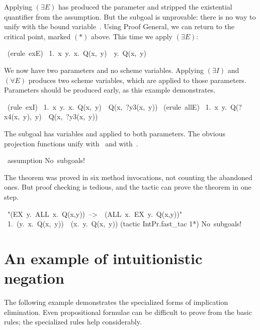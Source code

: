 Applying $(\exists E)$ has produced the parameter  and stripped the
existential quantifier from the assumption.  But the subgoal is unprovable:
there is no way to unify  with the bound variable~.
Using Proof General, we can return to the critical point, marked
$(*)$ above.  This time we apply $({\exists}E)$:
\begin{isabelle}
\ (erule\ exE)\isanewline
\ 1.\ \isasymAnd x\ y.\ \isasymforall x.\ Q(x,\ y)\
\isasymLongrightarrow \ \isasymexists y.\ Q(x,\ y)
\end{isabelle}
We now have two parameters and no scheme variables.  Applying
$({\exists}I)$ and $({\forall}E)$ produces two scheme variables, which are
applied to those parameters.  Parameters should be produced early, as this
example demonstrates.
\begin{isabelle}
\ (rule\ exI)\isanewline
\ 1.\ \isasymAnd x\ y.\ \isasymforall x.\ Q(x,\ y)\
\isasymLongrightarrow \ Q(x,\ ?y3(x,\ y))
\isanewline
{}\ (erule\ allE)\isanewline
\ 1.\ \isasymAnd x\ y.\ Q(?x4(x,\ y),\ y)\ \isasymLongrightarrow \
Q(x,\ ?y3(x,\ y))
\end{isabelle}
The subgoal has variables \isa{?y3} and \isa{?x4} applied to both
parameters.  The obvious projection functions unify  with~\isa{
x} and  with~.
\begin{isabelle}
\isacommand{apply}\ assumption\isanewline
No\ subgoals!\isanewline
\isacommand{done}
\end{isabelle}
The theorem was proved in six method invocations, not counting the
abandoned ones.  But proof checking is tedious, and the \ML{} tactic
 can prove the theorem in one step.
\begin{isabelle}
\isacommand{lemma}\ "(EX\ y.\ ALL\ x.\ Q(x,y))\ -->\ \ (ALL\ x.\ EX\ y.\ Q(x,y))"\isanewline
\ 1.\ (\isasymexists y.\ \isasymforall x.\ Q(x,\ y))\
\isasymlongrightarrow \ (\isasymforall x.\ \isasymexists y.\ Q(x,\ y))
\isanewline
\isacommand{by} (tactic \ttlbrace*IntPr.fast_tac 1*\ttrbrace)\isanewline
No\ subgoals!
\end{isabelle}


\section{An example of intuitionistic negation}
The following example demonstrates the specialized forms of implication
elimination.  Even propositional formulae can be difficult to prove from
the basic rules; the specialized rules help considerably.  

